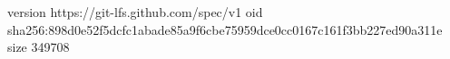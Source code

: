 version https://git-lfs.github.com/spec/v1
oid sha256:898d0e52f5dcfc1abade85a9f6cbe75959dce0cc0167c161f3bb227ed90a311e
size 349708
